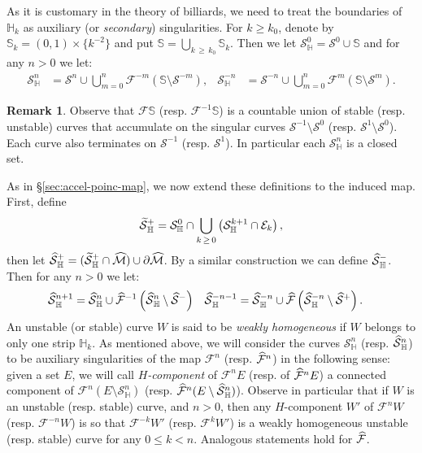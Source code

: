 \documentclass[10pt]{amsart}
\theoremstyle{definition}\newtheorem{defi}[theo]{Definition}\newtheorem{rema}[theo]{Remark}\newtheorem{exam}[theo]{Example}\newtheorem{exem}[theo]{Example}\newtheorem{nota}[theo]{Notation}
\newcommand{\inv}{^{-1}}
\newcommand{\hhs}{\mathbb{S}}
\newcommand{\homo}{\mathbb{H}}
\newcommand{\cE}{\mathcal E}
\newcommand{\cm}{\mathcal{F}}
\newcommand{\csp}{\mathcal{M}}
\newcommand{\cmp}{\hat\cm}
\newcommand{\cspi}{\widehat{\csp}}
\newcommand{\singPrivate}{\mathcal{S}}
\newcommand{\sing}[1]{\singPrivate^{#1}}
\newcommand{\singp}[1]{\hat{\singPrivate}^{#1}}
\newcommand{\hsing}[1]{{\singPrivate}_\homo^{#1}}
\newcommand{\hsingp}[1]{\hat{\singPrivate}_\homo^{#1}}
\newcommand{\singt}[1]{\tilde{\singPrivate}^{#1}}
\let\oldtilde\tilde
\renewcommand*{\tilde}[1]{\mathchoice{\widetilde{#1}}{\widetilde{#1}}{\oldtilde{#1}}{\oldtilde{#1}}}
\let\oldhat\hat
\renewcommand*{\hat}[1]{\mathchoice{\widehat{#1}}{\widehat{#1}}{\oldhat{#1}}{\oldhat{#1}}}
\begin{document}
As it is customary in the theory of billiards, we need to treat the boundaries of $\homo_k$ as auxiliary (or \emph{secondary}) singularities. For $k\ge k_{0}$, denote by $\hhs_{k} = (0,1)\times\{k^{-2}\}$ and put $\hhs = \bigcup_{k\,\ge\,k_{0}}\hhs_{k}$. Then we let $\hsing 0 = \sing0 \cup \hhs$ and for any $n > 0$ we let:
\begin{align}\label{e_definitionHSing}
\hsing{n} &= \sing n\cup \bigcup_{m = 0}^{n}\cm^{-m}(\hhs\setminus\sing{-m}),&
\hsing{-n} &= \sing{-n}\cup\bigcup_{m = 0}^{n} \cm^{m}(\hhs\setminus\sing{m}).
\end{align}
\begin{rema}\label{RkSCClosed}
Observe that $\cm\hhs$ (resp. $\cm^{-1}\hhs$) is a countable union of stable (resp. unstable) curves that accumulate on the singular curves $\sing{-1}\setminus\sing0$ (resp. $\sing{1}\setminus\sing0$). Each curve also terminates on $\sing{-1}$ (resp. $\sing{1}$). In particular each $\hsing n$ is a closed set.
\end{rema}

As in \S\ref{sec:accel-poinc-map}, we now extend these definitions to the induced map. First, define
\begin{align*}
\singt+_{\homo} = \hsing0 \cap \bigcup_{k\,\ge\,0}\left(\hsing{k+1}\cap\cE_{k}\right),
\end{align*}
then let $\hsingp+ = (\singt+_{\homo}\cap\cspi)\cup\partial\cspi$. By a similar construction we can define $\hsingp-$. Then for any $n > 0$ we let:
\begin{align}\label{e_definitionHSingp}
\hsingp{n+1} &= \hsingp n\cup\cmp\inv\left(\hsingp n\setminus\singp-\right)&
\hsingp{-n-1} &= \hsingp{-n}\cup\cmp\left(\hsingp{-n}\setminus\singp+\right).
\end{align}
An unstable (or stable) curve $W$ is said to be \emph{weakly homogeneous} if $W$ belongs to only one strip $\homo_{k}$. As mentioned above, we will consider the curves $\hsing{n}$ (resp. $\hsingp{n}$) to be auxiliary singularities of the map $\cm^{n}$ (resp. $\cmp^{n}$) in the following sense: given a set $E$, we will call \emph{$H$-component} of $\cm^{n}E$ (resp. of $\cmp^{n}E$) a connected component of $\cm^{n} (E\setminus\hsing{n})$ (resp. $\cmp^{n}(E\setminus\hsingp{n})$). Observe in particular that if $W$ is an unstable (resp. stable) curve, and $n > 0$, then any $H$-component $W'$ of $\cm^{n}W$ (resp. $\cm^{-n}W$) is so that $\cm^{-k}W'$ (resp. $\cm^{k}W'$) is a weakly homogeneous unstable (resp. stable) curve for any $0\le k < n$. Analogous statements hold for $\cmp$.
\end{document}
